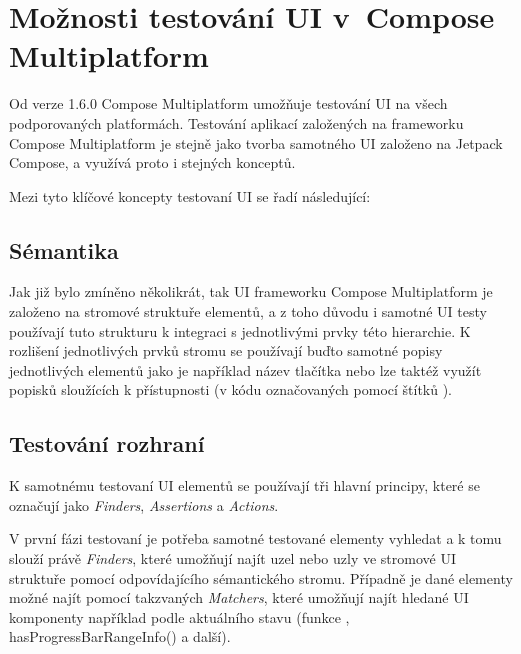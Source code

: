 

\section{Možnosti testování UI v~Compose Multiplatform}
Od verze 1.6.0 Compose Multiplatform umožňuje testování UI na všech podporovaných platformách. \cite{composeNews1.6.0}
Testování aplikací založených na frameworku Compose Multiplatform je stejně jako tvorba samotného UI založeno na Jetpack Compose, a využívá 
proto i stejných konceptů. 

\bigskip

Mezi tyto klíčové koncepty testovaní UI se řadí následující:


\subsection*{Sémantika}
Jak již bylo zmíněno několikrát, tak UI frameworku Compose Multiplatform je založeno na stromové struktuře elementů, a z toho důvodu 
i samotné UI testy používají tuto strukturu k integraci s jednotlivými prvky této hierarchie. K rozlišení jednotlivých prvků 
stromu se používají buďto samotné popisy jednotlivých elementů jako je například název tlačítka nebo lze taktéž využít popisků
sloužících k přístupnosti (v kódu označovaných pomocí štítků ).


\subsection*{Testování rozhraní}
K samotnému testovaní UI elementů se používají tři hlavní principy, které se
označují jako \textit{Finders}, \textit{Assertions} a \textit{Actions}.

V první fázi testovaní je potřeba samotné testované elementy vyhledat a k tomu slouží právě \textit{Finders}, které  umožňují najít
 uzel nebo uzly ve stromové UI struktuře pomocí odpovídajícího sémantického stromu. Případně je dané elementy možné najít
pomocí takzvaných \textit{Matchers}, které umožňují najít hledané UI komponenty například podle aktuálního stavu 
(funkce , hasProgressBarRangeInfo() a další).

